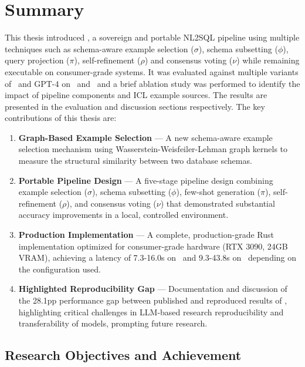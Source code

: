 \section{Summary}

This thesis introduced \Natural, a sovereign and portable NL2SQL pipeline using
multiple techniques such as schema-aware example selection ($\sigma$), schema
subsetting ($\phi$), query projection ($\pi$), self-refinement ($\rho$) and
consensus voting ($\nu$) while remaining executable on consumer-grade systems.
It was evaluated against multiple variants of \OmniSQL~and GPT-4 on \Spider~and
\Bird~and a brief ablation study was performed to identify the impact of
pipeline components and ICL example sources. The results are presented in the
evaluation and discussion sections respectively. The key contributions of this
thesis are:

\begin{enumerate}
    \item \textbf{Graph-Based Example Selection} — A new schema-aware example
        selection mechanism using Wasserstein-Weisfeiler-Lehman graph kernels
        to measure the structural similarity between two database schemas.
    \item \textbf{Portable Pipeline Design} — A five-stage pipeline design
        combining example selection ($\sigma$), schema subsetting ($\phi$),
        few-shot generation ($\pi$), self-refinement ($\rho$), and consensus
        voting ($\nu$) that demonstrated substantial accuracy improvements in
        a local, controlled environment.
    \item \textbf{Production Implementation} — A complete, production-grade Rust
        implementation optimized for consumer-grade hardware (RTX 3090, 24GB
        VRAM), achieving a latency of 7.3-16.0s on \Spider~and 9.3-43.8s on
        \Bird~depending on the configuration used.
    \item \textbf{Highlighted Reproducibility Gap} — Documentation and
        discussion of the 28.1pp performance gap between published and
        reproduced results of \OmniSQL, highlighting critical challenges in
        LLM-based research reproducibility and transferability of models,
        prompting future research.
\end{enumerate}

\subsection{Research Objectives and Achievement}

